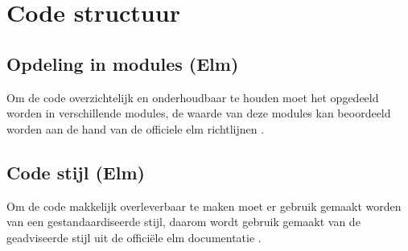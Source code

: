 \documentclass[12pt, a4paper]{report}
\begin{document}
    \chapter{Code structuur}
    \section{Opdeling in modules (Elm)}
    Om de code overzichtelijk en onderhoudbaar te houden moet het opgedeeld worden in verschillende modules,
    de waarde van deze modules kan beoordeeld worden aan de hand van de officiele elm richtlijnen \cite{elm-modules}.
    \section{Code stijl (Elm)}
    Om de code makkelijk overleverbaar te maken moet er gebruik gemaakt worden van een gestandaardiseerde stijl,
    daarom wordt gebruik gemaakt van de geadviseerde stijl uit de officiële elm documentatie \cite{elm-style}.

    \newpage
    \nocite{*}
    \printbibliography
\end{document}
